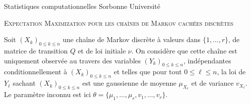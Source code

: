 \documentclass[a4paper,10pt,fleqn]{article}
\newcommand{\1}{\ensuremath{\mathbbm{1}}}
\begin{document}
\noindent Statistiques computationnelles \hfill Sorbonne Universit\'e 

\noindent\hrulefill

\begin{center}
\textsc{Expectation Maximization pour les cha\^ines de Markov cach\'ees discr\`etes}
\end{center}
\hrulefill

\medskip


Soit $(X_k)_{0\leq k\leq n}$ une cha\^ine de Markov discr\`ete \`a valeurs dans $\{1,\ldots,r\}$, de matrice de transition $Q$ et de loi initiale $\nu$. On consid\`ere que cette cha\^ine est uniquement observ\'ee au travers des variables $(Y_k)_{0\leq k\leq n}$, ind\'ependantes conditionnellement \`a $(X_k)_{0\leq k\leq n}$ et telles que pour tout $0\leq \ell\leq n$, la loi de $Y_\ell$ sachant $(X_k)_{0\leq k\leq n}$ est une gaussienne de moyenne $\mu_{X_\ell}$ et de variance $v_{X_\ell}$.
Le param\`etre inconnu est ici $\theta= \{\mu_1,\ldots,\mu_r,v_1,\ldots,v_r\}$.
\end{document}
